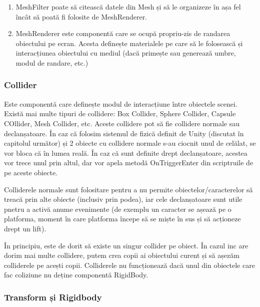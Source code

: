 \documentclass[12pt, a4paper]{article}
\begin{document}
	\begin{enumerate}
		\item MeshFilter poate să citească datele din Mesh și să le organizeze în așa fel încât să poată fi folosite de MeshRenderer.
		\item MeshRenderer este componentă care se ocupă propriu-zis de randarea obiectului pe ecran. Acesta definește materialele pe care să le folosească și interacțiunea obiectului cu mediul (dacă primește sau generează umbre, modul de randare, etc.)
	\end{enumerate}
	
	
	
	
	
	\subsubsection{Collider}
	
	Este componentă care definește modul de interacțiune între obiectele scenei. Există mai multe tipuri de collidere: Box Collider, Sphere Collider, Capsule COllider, Mesh Collider, etc. Aceste collidere pot să fie collidere normale sau declanșatoare. În caz că folosim sistemul de fizică definit de Unity (discutat în capitolul următor) și 2 obiecte cu collidere normale s-au ciocnit unul de celălat, se vor bloca că în lumea reală. În caz că sunt definite drept declanșatoare, acestea vor trece unul prin altul, dar vor apela metodă OnTriggerEnter din scriptruile de pe aceste obiecte.
	\newline
	
	Colliderele normale sunt folositare pentru a nu permite obiectelor/caracterelor să treacă prin alte obiecte (inclusiv prin podea), iar cele declanșatoare sunt utile pnetru a activă anume evenimente (de exemplu un caracter se așează pe o platforma, moment în care platforma începe să se miște în sus și să acționeze drept un lift).
	\newline
	
	În principiu, este de dorit să existe un singur collider pe obiect. În cazul inc are dorim mai multe collidere, putem crea copii ai obiectului curent și să așezăm colliderele pe acești copii. Colliderele nu funcționează dacă unul din obiectele care fac coliziune nu deține componentă RigidBody.
	
	
	
	
	\subsubsection{Transform și Rigidbody}
	
\end{document}

